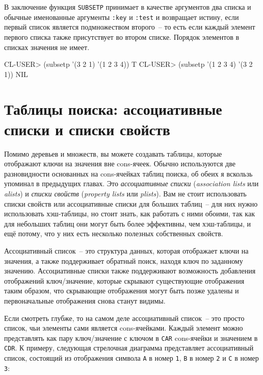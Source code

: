 В заключение функция \lstinline{SUBSETP} принимает в качестве аргументов два списка и обычные
именованные аргументы \lstinline{:key} и \lstinline{:test} и возвращает истину, если первый список
является подмножеством второго~-- то есть если каждый элемент первого списка также
присутствует во втором списке.  Порядок элементов в списках значения не имеет.

\begin{myverb}
  CL-USER> (subsetp '(3 2 1) '(1 2 3 4))
  T
  CL-USER> (subsetp '(1 2 3 4) '(3 2 1))
  NIL
\end{myverb}


\section{Таблицы поиска: ассоциативные списки и списки свойств}

Помимо деревьев и множеств, вы можете создавать таблицы, которые отображают ключи на
значения вне cons-ячеек. Обычно используются две разновидности основанных на cons-ячейках
таблиц поиска, об обеих я вскользь упоминал в предыдущих главах. Это \textit{ассоциативные
  списки} (\textit{association lists} или \textit{alists}) и \textit{списки свойств}
(\textit{property lists} или \textit{plists}). Вам не стоит использовать списки свойств
или ассоциативные списки для больших таблиц~-- для них нужно использовать хэш-таблицы, но
стоит знать, как работать с ними обоими, так как для небольших таблиц они могут быть более
эффективны, чем хэш-таблицы, и ещё потому, что у них есть несколько полезных собственных
свойств.
 
Ассоциативный список~-- это структура данных, которая отображает ключи на значения, а также
поддерживает обратный поиск, находя ключ по заданному значению. Ассоциативные списки также
поддерживают возможность добавления отображений ключ/значение, которые скрывают
существующие отображения таким образом, что скрывающие отображения могут быть позже
удалены и первоначальные отображения снова станут видимы.

Если смотреть глубже, то на самом деле ассоциативный список~-- это просто список, чьи
элементы сами является cons-ячейками. Каждый элемент можно представлять как пару
ключ/значение с ключом в \lstinline{CAR} cons-ячейки и значением в \lstinline{CDR}. К примеру,
следующая стрелочная диаграмма представляет ассоциативный список, состоящий из отображения
символа \lstinline{A} в номер \lstinline{1}, \lstinline{B} в номер \lstinline{2} и \lstinline{C} в номер \lstinline{3}:

